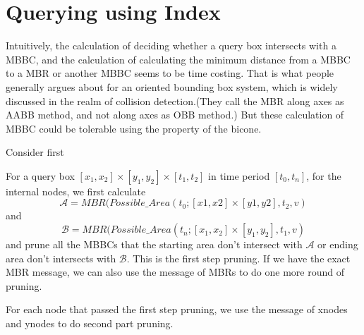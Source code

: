 \documentclass[sigplan]{acmart}
\begin{document}
\section{Querying using Index} \label{sec:query}
Intuitively, the calculation of deciding whether a query box intersects with a MBBC, and the calculation of calculating the minimum distance from a MBBC to a MBR or another MBBC seems to be time costing. That is what people generally argues about for an oriented bounding box system, which is widely discussed in the realm of collision detection.(They call the MBR along axes as AABB method, and not along axes as OBB method.) But these calculation of MBBC could be tolerable using the property of the bicone.\par

Consider first

For a query box $[x_1,x_2] \times [y_1,y_2] \times [t_1,t_2]$ in time period $[t_0,t_n]$, for the internal nodes, we first calculate
$$\mathcal{A} = MBR(Possible\_Area(t_0;[x1,x2] \times [y1,y2], t_2, v)$$
and
$$\mathcal{B} = MBR(Possible\_Area(t_n;[x_1,x_2] \times [y_1,y_2], t_1, v)$$
and prune all the MBBCs that the starting area don't intersect with $\mathcal{A}$ or ending area don't intersects with $\mathcal{B}$. This is the first step pruning. If we have the exact MBR message, we can also use the message of MBRs to do one more round of pruning.\par
For each node that passed the first step pruning, we use the message of xnodes and ynodes to do second part pruning.
\end{document}
